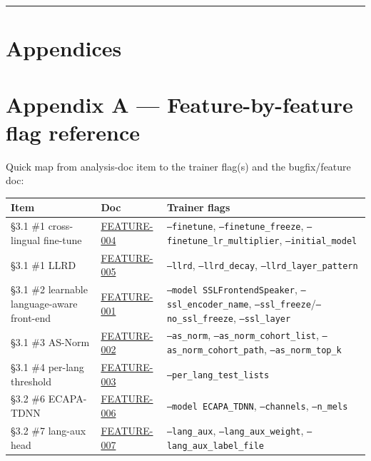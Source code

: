 \documentclass[10pt,a4paper]{article}
\renewcommand{\arraystretch}{1.15}
\begin{document}
\vspace{0.5em}\hrule\vspace{0.5em}

\section*{Appendices}

\section*{Appendix A --- Feature-by-feature flag reference}

Quick map from analysis-doc item to the trainer flag(s) and the bugfix/feature doc:

\begin{center}
\small
\renewcommand{\arraystretch}{1.25}
\begin{tabularx}{\textwidth}{|Y|Y|Y|}
\hline
Item & Doc & Trainer flags \\
\hline
§3.1 \#1 cross-lingual fine-tune & \href{docs/bugfixes/FEATURE-004-cross-lingual-finetune.md}{FEATURE-004} & \texttt{--finetune}, \texttt{--finetune\_freeze}, \texttt{--finetune\_lr\_multiplier}, \texttt{--initial\_model} \\
\hline
§3.1 \#1 LLRD & \href{docs/bugfixes/FEATURE-005-llrd.md}{FEATURE-005} & \texttt{--llrd}, \texttt{--llrd\_decay}, \texttt{--llrd\_layer\_pattern} \\
\hline
§3.1 \#2 learnable language-aware front-end & \href{docs/bugfixes/FEATURE-001-language-aware-frontend.md}{FEATURE-001} & \texttt{--model SSLFrontendSpeaker}, \texttt{--ssl\_encoder\_name}, \texttt{--ssl\_freeze}/\texttt{--no\_ssl\_freeze}, \texttt{--ssl\_layer} \\
\hline
§3.1 \#3 AS-Norm & \href{docs/bugfixes/FEATURE-002-as-norm-score-normalisation.md}{FEATURE-002} & \texttt{--as\_norm}, \texttt{--as\_norm\_cohort\_list}, \texttt{--as\_norm\_cohort\_path}, \texttt{--as\_norm\_top\_k} \\
\hline
§3.1 \#4 per-lang threshold & \href{docs/bugfixes/FEATURE-003-per-language-eval.md}{FEATURE-003} & \texttt{--per\_lang\_test\_lists} \\
\hline
§3.2 \#6 ECAPA-TDNN & \href{docs/bugfixes/FEATURE-006-ecapa-tdnn.md}{FEATURE-006} & \texttt{--model ECAPA\_TDNN}, \texttt{--channels}, \texttt{--n\_mels} \\
\hline
§3.2 \#7 lang-aux head & \href{docs/bugfixes/FEATURE-007-lang-aux-head.md}{FEATURE-007} & \texttt{--lang\_aux}, \texttt{--lang\_aux\_weight}, \texttt{--lang\_aux\_label\_file} \\

\end{tabularx}
\end{center}
\end{document}
